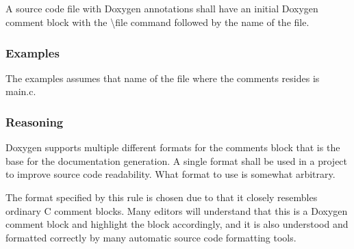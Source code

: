 \subsection*{\doxygenRule{}}

A source code file with Doxygen annotations shall have an initial Doxygen comment block with the \textbackslash file command followed by the name of the file.

\subsubsection*{Examples}

The examples assumes that name of the file where the comments resides is main.c.

\noindent
\begin{minipage}[t]{0.47\textwidth}
    
\end{minipage}\hfill
\begin{minipage}[t]{0.47\textwidth}
    
\end{minipage}

\subsubsection*{Reasoning}

Doxygen supports multiple different formats for the comments block that is the base for the documentation generation. A single format shall be used in a project to improve source code readability. What format to use is somewhat arbitrary.

The format specified by this rule is chosen due to that it closely resembles ordinary C comment blocks. Many editors will understand that this is a Doxygen comment block and highlight the block accordingly, and it is also understood and formatted correctly by many automatic source code formatting tools.
